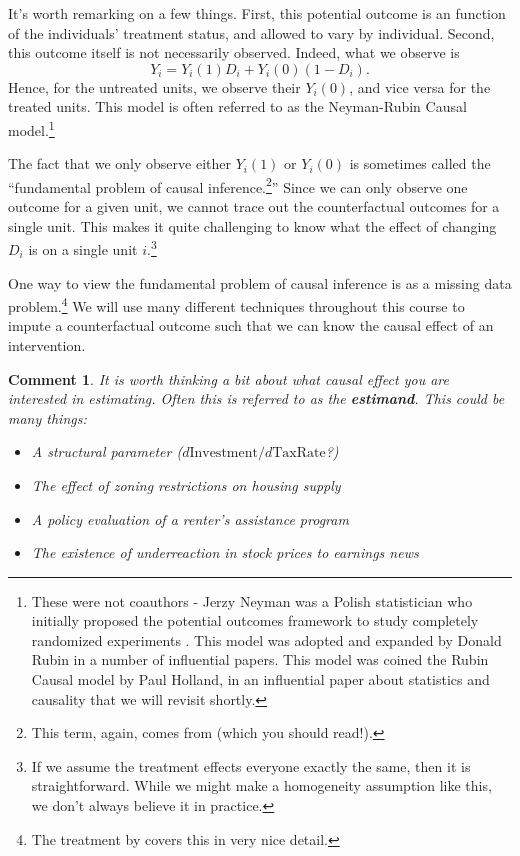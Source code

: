 \documentclass{tufte-handout}
\theoremstyle{break}
\newtheorem{cmt}{Comment}
\begin{document}
It's worth remarking on a few things. First, this potential outcome  is an  function of the individuals' treatment status, and allowed to vary by individual. Second, this outcome itself is not necessarily observed. Indeed, what we observe is 
\begin{equation}
  Y_{i} = Y_{i}(1)D_{i} + Y_{i}(0)(1-D_{i}).
\end{equation}
Hence, for the untreated units, we observe their $Y_{i}(0)$, and vice versa for the treated units. This model is often referred to as the Neyman-Rubin Causal model.\footnote{These were not coauthors - Jerzy Neyman was a Polish statistician who initially proposed the potential outcomes framework to study completely randomized experiments \citep{neyman1990}. This model was adopted and expanded by Donald Rubin in a number of influential papers. This model was coined the Rubin Causal model by Paul Holland, in an influential paper \citep{holland1986statistics} about statistics and causality that we will revisit shortly.}

The fact that we only observe either $Y_{i}(1)$ or $Y_{i}(0)$ is sometimes called the ``fundamental problem of causal inference.\footnote{This term, again, comes from \citet{holland1986statistics} (which you should read!).}'' Since we can only observe one outcome for a given unit, we cannot trace out the counterfactual outcomes for a single unit. This makes  it quite challenging to know what the effect of changing $D_{i}$ is on a single unit $i$.\footnote{If we assume the treatment effects everyone exactly the same, then it is straightforward. While we might make a homogeneity assumption like this, we don't always believe it in practice.} 

One way to view the fundamental problem of causal inference is as a missing data problem.\footnote{The treatment by \citet{aronow2019foundations} covers this in very nice detail.} We will use many different techniques throughout this course to impute a counterfactual outcome such that we can know the causal effect of an intervention. 


\begin{boxF}
  \begin{cmt}
    It is worth thinking a bit about what causal effect you are interested in estimating. Often this is referred to as the \textbf{estimand}. This could be many things:
    \begin{itemize}
      \item A structural parameter ($d\text{Investment}/d\text{TaxRate}$?)
      \item The effect of zoning restrictions on housing supply
      \item A policy evaluation of a renter's assistance program
      \item The existence of underreaction in stock prices to earnings news
    \end{itemize}
    \end{cmt}
  \end{boxF}
\end{document}
